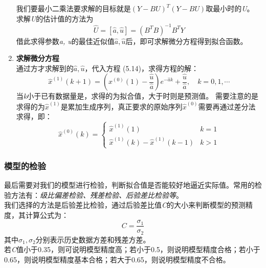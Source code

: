 \documentclass[a4paper, 12pt]{article}
\numberwithin{equation}{section}
\begin{document}
\begin{enumerate}
                            我们要最小二乘法要求解的目标就是$ (Y - BU)^{T}(Y - BU) $取最小时的\textit{U}。
                            求解\textit{U}的估计值的方法为
                            \[ \hat{U} = [\hat{a}, \hat{u}] = (B^{T}B)^{-1}B^{T}Y \]
                            借此求得参数\textit{a, u}的最佳近似值$ \hat{a}, \hat{u} $后，即可求解微分方程得到拟合函数。


                        \item \textbf{求解微分方程} \\
                            通过方才求解到的$ \hat{a}, \hat{u} $，代入方程 (5.14)，求得方程的解：
                            \begin{equation}
                                \hat{x}^{(1)} (k + 1) = (x^{(0)}(1) - \frac{\hat{u}}{\hat{a}})e^{-\hat{a}k} + \frac{\hat{u}}{\hat{a}}, \quad k = 0, 1, \cdots
                            \end{equation}
                            当\textit{k}小于已有数据量是，求得的为拟合值，大于时则是预测值。
                            需要注意的是求得的为$ \hat{x}^{(1)} $是累加生成序列，真正要求的原始序列$ \hat{x}^{(0)} $需要再通过差分法求得，即：
                            \begin{equation}
                                \hat{x}^{(0)}(k) =
                                \begin{cases}
                                    \hat{x}^{(1)}(1) & k = 1 \\
                                    \hat{x}^{(1)}(k) - \hat{x}^{(1)}(k - 1) & k > 1
                                \end{cases}
                            \end{equation}
                    \end{enumerate}


                \subsubsection{模型的检验}
                    最后需要对我们的模型进行检验，判断拟合值是否能较好地逼近实际值。常用的检验方法有：\textit{级比偏差检验、残差检验、后验差比检验等}。\\
                    我们选择的方法是后验差比检验，通过后验差比值\textit{C}的大小来判断模型的预测精度，其计算公式为：
                    \begin{equation}
                        C = \frac{\sigma _{1}}{\sigma _{2}}
                    \end{equation}
                    其中$ \sigma _{1}, \sigma _{2} $分别表示历史数据方差和残差方差。 \\
                    若\textit{C}值小于0.35，则可说明模型精度高；若小于0.5，则说明模型精度合格；若小于0.65，则说明模型精度基本合格；若大于0.65，则说明模型精度不合格。
\end{document}
